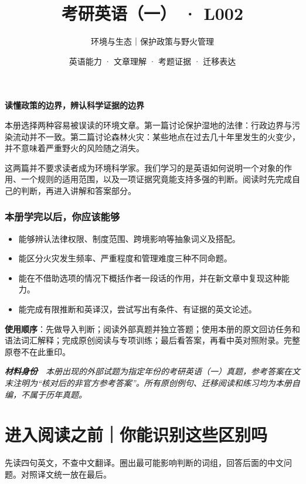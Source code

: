 \documentclass[
  11pt,
]{ctexart}
\title{考研英语（一） · L002}
\subtitle{环境与生态｜保护政策与野火管理}
\author{英语能力 · 文章理解 · 考题证据 · 迁移表达}
\date{}
\renewenvironment{quote}{\begin{tcolorbox}[enhanced,breakable,colback=sand,colframe=primary!22,boxrule=0.4pt,arc=2pt,left=2.6mm,right=2.6mm,top=1.6mm,bottom=1.6mm]\itshape}{\end{tcolorbox}}
\begin{document}
\maketitle

{
\setcounter{tocdepth}{2}
\tableofcontents
}
\textbf{读懂政策的边界，辨认科学证据的边界}

本册选择两种容易被误读的环境文章。第一篇讨论保护湿地的法律：行政边界与污染流动并不一致。第二篇讨论森林火灾：某些地点在过去几十年里发生的火变少，并不意味着严重野火的风险随之消失。

这两篇并不要求读者成为环境科学家。我们学习的是英语如何说明一个对象的作用、一个规则的适用范围，以及一项证据究竟能支持多强的判断。阅读时先完成自己的判断，再进入讲解和答案部分。

\subsubsection{本册学完以后，你应该能够}\label{ux672cux518cux5b66ux5b8cux4ee5ux540eux4f60ux5e94ux8be5ux80fdux591f}

\begin{itemize}
\item
  能够辨认法律权限、制度范围、跨境影响等抽象词义及搭配。
\item
  能区分火灾发生频率、严重程度和管理难度三种不同命题。
\item
  能在不借助选项的情况下概括作者一段话的作用，并在新文章中复现这种能力。
\item
  能完成有限推断和英译汉，尝试写出有条件、有证据的英文论述。
\end{itemize}

\textbf{使用顺序}：先做导入判断；阅读外部真题并独立答题；使用本册的原文回访任务和语法词汇解释；完成原创阅读与专项训练；最后看答案，再看中英对照附录。完整原卷不在此重印。

\begin{quote}
\textbf{材料身份}　本册出现的外部试题为指定年份的考研英语（一）真题，参考答案在文末注明为``核对后的非官方参考答案''。所有原创例句、迁移阅读和练习均为本册自编，不属于历年真题。
\end{quote}

\section{进入阅读之前｜你能识别这些区别吗}\label{ux8fdbux5165ux9605ux8bfbux4e4bux524dux4f60ux80fdux8bc6ux522bux8fd9ux4e9bux533aux522bux5417}

先读四句英文，不查中文翻译。圈出最可能影响判断的词组，回答后面的中文问题。对照译文统一放在最后。
\end{document}
